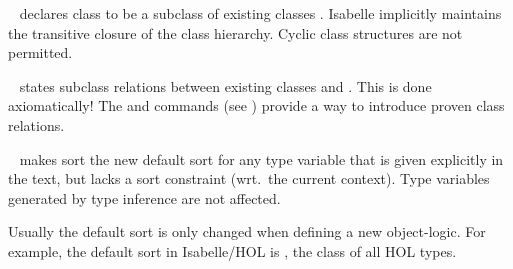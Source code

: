 \begin{isabellebody}
\begin{isamarkuptext}
  \begin{description}

  \item \hyperlink{command.classes}{\mbox{}}~ declares class
   to be a subclass of existing classes .
  Isabelle implicitly maintains the transitive closure of the class
  hierarchy.  Cyclic class structures are not permitted.

  \item \hyperlink{command.classrel}{\mbox{}}~ states subclass
  relations between existing classes  and .
  This is done axiomatically!  The \hyperlink{command.subclass}{\mbox{}} and
  \hyperlink{command.instance}{\mbox{}} commands (see ) provide
  a way to introduce proven class relations.

  \item \hyperlink{command.default-sort}{\mbox{}}~ makes sort  the
  new default sort for any type variable that is given explicitly in
  the text, but lacks a sort constraint (wrt.\ the current context).
  Type variables generated by type inference are not affected.

  Usually the default sort is only changed when defining a new
  object-logic.  For example, the default sort in Isabelle/HOL is
  , the class of all HOL types.


\end{description}
\end{isamarkuptext}
\end{isabellebody}
